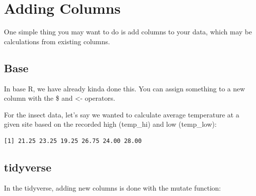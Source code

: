 \documentclass[
  letterpaper,
  DIV=11,
  numbers=noendperiod]{scrreprt}
\newenvironment{Shaded}{\begin{snugshade}}{\end{snugshade}}
\newcommand{\AttributeTok}[1]{\textcolor[rgb]{0.40,0.45,0.13}{#1}}
\newcommand{\DecValTok}[1]{\textcolor[rgb]{0.68,0.00,0.00}{#1}}
\newcommand{\DocumentationTok}[1]{\textcolor[rgb]{0.37,0.37,0.37}{\textit{#1}}}
\newcommand{\FunctionTok}[1]{\textcolor[rgb]{0.28,0.35,0.67}{#1}}
\newcommand{\NormalTok}[1]{\textcolor[rgb]{0.00,0.23,0.31}{#1}}
\newcommand{\OtherTok}[1]{\textcolor[rgb]{0.00,0.23,0.31}{#1}}
\newcommand{\SpecialCharTok}[1]{\textcolor[rgb]{0.37,0.37,0.37}{#1}}
\begin{document}
\section{Adding Columns}\label{adding-columns}

One simple thing you may want to do is add columns to your data, which
may be calculations from existing columns.

\subsection{Base}\label{base}

In base R, we have already kinda done this. You can assign something to
a new column with the \$ and \textless- operators.

For the insect data, let's say we wanted to calculate average
temperature at a given site based on the recorded high (temp\_hi) and
low (temp\_low):

\begin{Shaded}
\end{Shaded}

\begin{verbatim}
[1] 21.25 23.25 19.25 26.75 24.00 28.00
\end{verbatim}

\subsection{tidyverse}\label{tidyverse}

In the tidyverse, adding new columns is done with the mutate function:

\begin{Shaded}
\end{Shaded}
\end{document}
